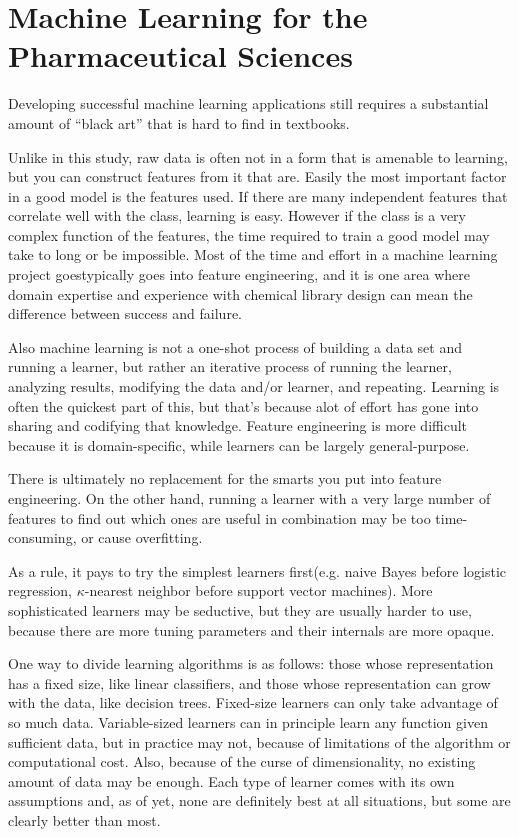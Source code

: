 \section{Machine Learning for the Pharmaceutical Sciences}
Developing successful machine learning applications still requires a substantial amount of “black art” that is hard to find in textbooks.\cite{Domingos2012}

Unlike in this study, raw data is often not in a form that is amenable to learning, but you can construct features from it that are. Easily the most important factor in a good model is the features used. If there are many independent features that correlate well with the class, learning is easy. However if the class is a very complex function of the features, the time required to train a good model may take to long or be impossible. \cite{Domingos2012} Most of the time and effort in a machine learning project goestypically goes into feature engineering, and it is one area where domain expertise and experience with chemical library design can mean the difference between success and failure.

Also machine learning is not a one-shot process of building a data set and running a learner, but rather an iterative process of running the learner, analyzing results, modifying the data and/or learner, and repeating. Learning is often the quickest part of this, but that’s because alot of effort has gone into sharing and codifying that knowledge. Feature engineering is more difficult because it is domain-specific, while learners can be largely general-purpose.\cite{Domingos2012}

There is ultimately no replacement for the smarts you put into feature engineering. On the other hand, running a learner with a very large number of features to find out which ones are useful in combination may be too time-consuming, or cause overfitting.\cite{Domingos2012}

As a rule, it pays to try the simplest learners first(e.g. naive Bayes before logistic regression, $\kappa$-nearest neighbor before support vector machines). More sophisticated learners may be seductive, but they are usually harder to use, because there are more tuning parameters and their internals are more opaque.\cite{Domingos2012}

One way to divide learning algorithms is as follows: those whose representation has a fixed size, like linear classifiers, and those whose representation can grow with the data, like decision trees. Fixed-size learners can only take advantage of so much data. Variable-sized learners can in principle learn any function given sufficient data, but in practice may not, because of limitations of the algorithm or computational cost. Also, because of the curse of dimensionality, no existing amount of data may be enough. \cite{Domingos2012} Each type of learner comes with its own assumptions and, as of yet, none are definitely best at all situations, but some are clearly better than most. \cite{Hand2006,Delgado2014}


